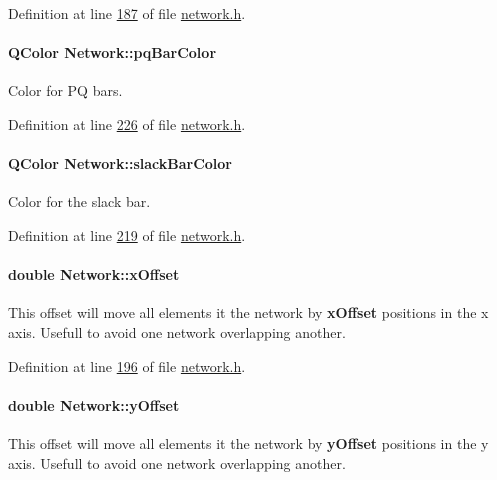 Definition at line \hyperlink{network_8h_source_l00187}{187} of file \hyperlink{network_8h_source}{network.\+h}.

\hypertarget{class_network_a610c48c9e2dd9555f9b354ab72fb96cc}{}
\paragraph[{pq\+Bar\+Color}]{\setlength{\rightskip}{0pt plus 5cm}Q\+Color Network\+::pq\+Bar\+Color}\label{class_network_a610c48c9e2dd9555f9b354ab72fb96cc}
Color for P\+Q bars. 

Definition at line \hyperlink{network_8h_source_l00226}{226} of file \hyperlink{network_8h_source}{network.\+h}.

\hypertarget{class_network_ac6c44cb1f88cd67a4fab7eff948e2d1d}{}
\paragraph[{slack\+Bar\+Color}]{\setlength{\rightskip}{0pt plus 5cm}Q\+Color Network\+::slack\+Bar\+Color}\label{class_network_ac6c44cb1f88cd67a4fab7eff948e2d1d}
Color for the slack bar. 

Definition at line \hyperlink{network_8h_source_l00219}{219} of file \hyperlink{network_8h_source}{network.\+h}.

\hypertarget{class_network_a9f5c70be28a45320802bd0ac3947d114}{}
\paragraph[{x\+Offset}]{\setlength{\rightskip}{0pt plus 5cm}double Network\+::x\+Offset}\label{class_network_a9f5c70be28a45320802bd0ac3947d114}
This offset will move all elements it the network by {\bfseries x\+Offset} positions in the x axis. Usefull to avoid one network overlapping another. 

Definition at line \hyperlink{network_8h_source_l00196}{196} of file \hyperlink{network_8h_source}{network.\+h}.

\hypertarget{class_network_a771b16f7eb4459d0ca7141c048b1ab59}{}
\paragraph[{y\+Offset}]{\setlength{\rightskip}{0pt plus 5cm}double Network\+::y\+Offset}\label{class_network_a771b16f7eb4459d0ca7141c048b1ab59}
This offset will move all elements it the network by {\bfseries y\+Offset} positions in the y axis. Usefull to avoid one network overlapping another. 


